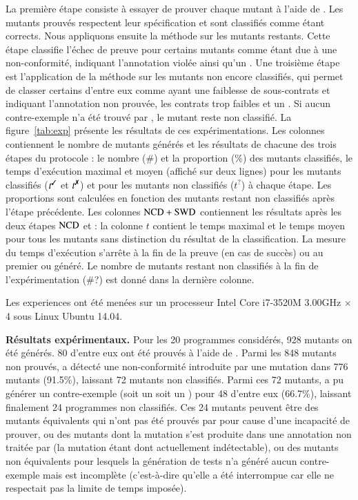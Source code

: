 La première étape consiste à essayer de prouver chaque mutant à l'aide de \Wp.
Les mutants prouvés respectent leur spécification et sont classifiés comme étant
corrects.
Nous appliquons ensuite la méthode \NCD sur les mutants restants.
Cette étape classifie l'échec de preuve pour certains mutants comme étant due à
une non-conformité, indiquant l'annotation violée ainsi qu'un \NCCE.
Une troisième étape est l'application de la méthode \SWD sur les mutants non
encore classifiés, qui permet de classer certains d'entre eux comme ayant
une faiblesse de sous-contrats et indiquant l'annotation non prouvée, les
contrats trop faibles et un \SWCE.
Si aucun contre-exemple n'a été trouvé par \SWD, le mutant reste non classifié.
La figure~\ref{tab:exp} présente les résultats de ces expérimentations.
Les colonnes contiennent le nombre de mutants générés et les résultats de
chacune des trois étapes du protocole : le nombre (\#) et la proportion (\%) des
mutants classifiés, le temps d'exécution maximal et moyen (affiché sur deux
lignes) pour les mutants classifiés ($t^\text{\ok}$ et $t^\text{\ko}$) et pour
les mutants non classifiés ($t^\text{?}$) à chaque étape.
Les proportions sont calculées en fonction des mutants restant non classifiés
après l'étape précédente.
Les colonnes $\mathrm{NCD}+\mathrm{SWD}$ contiennent les résultats après les deux étapes $\mathrm{NCD}$
et \SWD : la colonne $t$ contient le temps maximal et le temps moyen pour tous
les mutants sans distinction du résultat de la classification.
La mesure du temps d'exécution s'arrête à la fin de la preuve (en cas de succès)
ou au premier \NCCE ou \SWCE généré.
Le nombre de mutants restant non classifiés à la fin de l'expérimentation (\#?)
est donné dans la dernière colonne.

Les experiences ont été menées sur un processeur Intel Core i7-3520M 3.00GHz
$\times$ 4 sous Linux Ubuntu 14.04.


\textbf{Résultats expérimentaux.}
Pour les 20 programmes considérés, 928 mutants on été générés.
80 d'entre eux ont été prouvés à l'aide de \Wp.
Parmi les 848 mutants non prouvés, \NCD a détecté une non-conformité introduite
par une mutation dans 776 mutants (91.5\%), laissant 72 mutants non classifiés.
Parmi ces 72 mutants, \SWD a pu générer un contre-exemple (soit un \NCCE soit un
\SWCE) pour 48 d'entre eux (66.7\%), laissant finalement 24 programmes non
classifiés.
Ces 24 mutants peuvent être des mutants équivalents qui n'ont pas été
prouvés par \Wp pour cause d'une incapacité de prouver, ou des mutants dont la
mutation s'est produite dans une annotation non traitée par \stady (la mutation
étant dont actuellement indétectable), ou des mutants non équivalents pour
lesquels la génération de tests n'a généré aucun contre-exemple mais est
incomplète (c'est-à-dire qu'elle a été interrompue car elle ne respectait pas la
limite de temps imposée).


